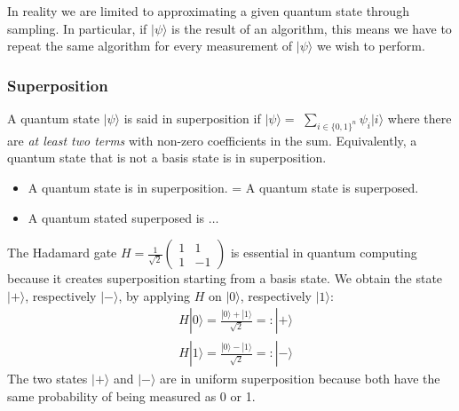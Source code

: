 In reality we are limited to approximating a given quantum state through sampling. In particular, if $|\psi\rangle$ is the result of an algorithm, this means we have to repeat the same algorithm for every measurement of $|\psi\rangle$ we wish to perform.

\subsubsection{Superposition}

\begin{definition}[Superposition]
    A quantum state $|\psi\rangle$ is said in superposition if $|\psi\rangle=$ $\sum_{i \in\{0,1\}^{n}} \psi_{i}|i\rangle$ where there are \textit{at least two terms }with non-zero coefficients in the sum. Equivalently, a quantum state that is not a basis state is in superposition.
\end{definition}

\begin{remark}
    \begin{itemize}
    \item A quantum state is in superposition. = A quantum state is superposed.
    \item A quantum stated superposed is $\dots$
    \end{itemize}
\end{remark}

The Hadamard gate $H=\frac{1}{\sqrt{2}}\left(\begin{array}{cc}1 & 1 \\ 1 & -1\end{array}\right)$ is essential in quantum computing because it creates superposition starting from a basis state. We obtain the state $|+\rangle$, respectively $|-\rangle$, by applying $H$ on $|0\rangle$, respectively $|1\rangle:$
\begin{equation}
\begin{aligned}
& H|0\rangle=\frac{|0\rangle+|1\rangle}{\sqrt{2}}=:|+\rangle \\
& H|1\rangle=\frac{|0\rangle-|1\rangle}{\sqrt{2}}=:|-\rangle
\end{aligned}
\end{equation}
The two states $|+\rangle$ and $|-\rangle$ are in uniform superposition because both have the same probability of being measured as 0 or 1.

